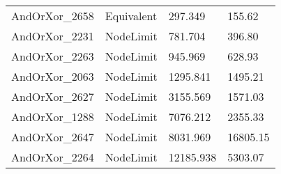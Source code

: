 \begin{tabular}{llll}
AndOrXor\_2658 & Equivalent & 297.349 & 155.62 \\
AndOrXor\_2231 & NodeLimit & 781.704 & 396.80 \\
AndOrXor\_2263 & NodeLimit & 945.969 & 628.93 \\
AndOrXor\_2063 & NodeLimit & 1295.841 & 1495.21 \\
AndOrXor\_2627 & NodeLimit & 3155.569 & 1571.03 \\
AndOrXor\_1288 & NodeLimit & 7076.212 & 2355.33 \\
AndOrXor\_2647 & NodeLimit & 8031.969 & 16805.15 \\
AndOrXor\_2264 & NodeLimit & 12185.938 & 5303.07 \\
\bottomrule
\end{tabular}
